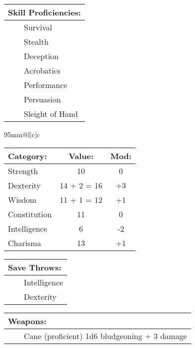 \documentclass[11pt]{article}
\newcommand{\tabitem}{~~\llap{--}~~}
\begin{document}
\begin{multicols}{2}
\vspace{2mm}

\noindent \begin{tabularx}{95mm}{@{}l}
{\Large \textbf{Skill Proficiencies:}} \\
\hline
\tabitem Survival \\
\tabitem Stealth \\
\tabitem Deception \\
\tabitem Acrobatics \\
\tabitem Performance \\
\tabitem Persuasion \\
\tabitem Sleight of Hand
		\end{tabularx}

\vspace{4mm}

\noindent \begin{tabularx}{95mm}{@{}l|c|c}
 \\
\hline
		\end{tabularx}
\noindent \begin{tabular}{@{}l|c|c}
\textbf{Category:} 			& \textbf{Value:} 	& \textbf{Mod:} \\
\hline
Strength 					& 10 				& 0			\\
Dexterity 					& 14 + 2 = 16		& +3		\\
Wisdom 						& 11 + 1 = 12		& +1		\\
Constitution 				& 11 				& 0			\\
Intelligence 				& 6 				& -2		\\
Charisma 					& 13 				& +1
		\end{tabular}

\vspace{4mm}

\noindent \begin{tabularx}{95mm}{@{}l}
{\Large \textbf{Save Throws:}} \\
\hline
\tabitem Intelligence \\
\tabitem Dexterity \\
		\end{tabularx}

\vspace{4mm}

\noindent \begin{tabularx}{95mm}{@{}l}
{\Large \textbf{Weapons:}} \\
\hline
\tabitem Cane (proficient) 1d6 bludgeoning + 3 damage
		\end{tabularx}


\end{multicols}
\end{document}
